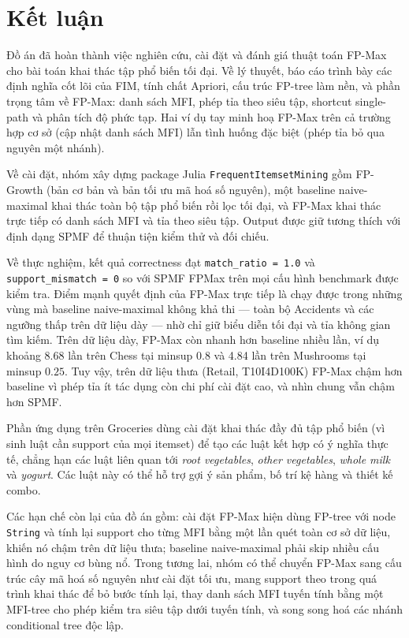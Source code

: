 \section{Kết luận}
\label{sec:conclusion}

Đồ án đã hoàn thành việc nghiên cứu, cài đặt và đánh giá thuật toán FP-Max cho bài toán khai thác tập phổ biến tối đại. Về lý thuyết, báo cáo trình bày các định nghĩa cốt lõi của FIM, tính chất Apriori, cấu trúc FP-tree làm nền, và phần trọng tâm về FP-Max: danh sách MFI, phép tỉa theo siêu tập, shortcut single-path và phân tích độ phức tạp. Hai ví dụ tay minh hoạ FP-Max trên cả trường hợp cơ sở (cập nhật danh sách MFI) lẫn tình huống đặc biệt (phép tỉa bỏ qua nguyên một nhánh).

Về cài đặt, nhóm xây dựng package Julia \texttt{FrequentItemsetMining} gồm FP-Growth (bản cơ bản và bản tối ưu mã hoá số nguyên), một baseline naive-maximal khai thác toàn bộ tập phổ biến rồi lọc tối đại, và FP-Max khai thác trực tiếp có danh sách MFI và tỉa theo siêu tập. Output được giữ tương thích với định dạng SPMF để thuận tiện kiểm thử và đối chiếu.

Về thực nghiệm, kết quả correctness đạt \texttt{match\_ratio = 1.0} và \texttt{support\_mismatch = 0} so với SPMF FPMax trên mọi cấu hình benchmark được kiểm tra. Điểm mạnh quyết định của FP-Max trực tiếp là chạy được trong những vùng mà baseline naive-maximal không khả thi --- toàn bộ Accidents và các ngưỡng thấp trên dữ liệu dày --- nhờ chỉ giữ biểu diễn tối đại và tỉa không gian tìm kiếm. Trên dữ liệu dày, FP-Max còn nhanh hơn baseline nhiều lần, ví dụ khoảng 8.68 lần trên Chess tại minsup $0.8$ và 4.84 lần trên Mushrooms tại minsup $0.25$. Tuy vậy, trên dữ liệu thưa (Retail, T10I4D100K) FP-Max chậm hơn baseline vì phép tỉa ít tác dụng còn chi phí cài đặt cao, và nhìn chung vẫn chậm hơn SPMF.

Phần ứng dụng trên Groceries dùng cài đặt khai thác đầy đủ tập phổ biến (vì sinh luật cần support của mọi itemset) để tạo các luật kết hợp có ý nghĩa thực tế, chẳng hạn các luật liên quan tới \textit{root vegetables}, \textit{other vegetables}, \textit{whole milk} và \textit{yogurt}. Các luật này có thể hỗ trợ gợi ý sản phẩm, bố trí kệ hàng và thiết kế combo.

Các hạn chế còn lại của đồ án gồm: cài đặt FP-Max hiện dùng FP-tree với node \texttt{String} và tính lại support cho từng MFI bằng một lần quét toàn cơ sở dữ liệu, khiến nó chậm trên dữ liệu thưa; baseline naive-maximal phải skip nhiều cấu hình do nguy cơ bùng nổ. Trong tương lai, nhóm có thể chuyển FP-Max sang cấu trúc cây mã hoá số nguyên như cài đặt tối ưu, mang support theo trong quá trình khai thác để bỏ bước tính lại, thay danh sách MFI tuyến tính bằng một MFI-tree cho phép kiểm tra siêu tập dưới tuyến tính, và song song hoá các nhánh conditional tree độc lập.
